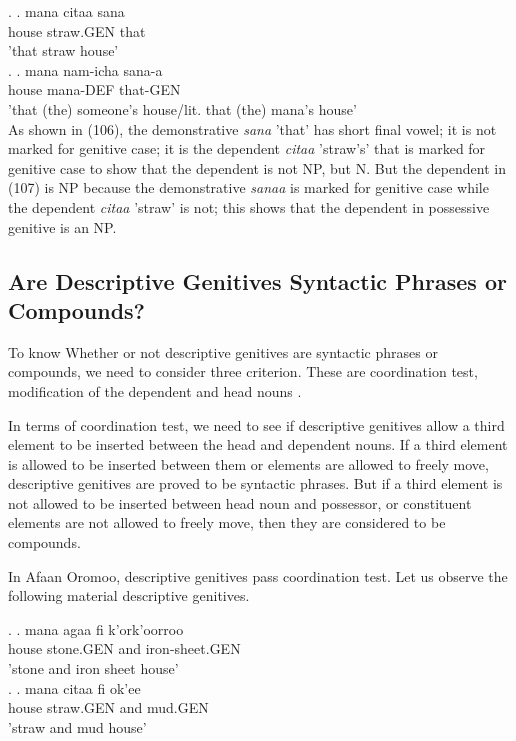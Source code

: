 \documentclass[11pt,a4paper]{article}
\begin{document}
	\ex.
	\ag.
	mana citaa sana \\
	house straw.GEN that\\
	'that  straw house'\\
	
	\ex.
	\ag.
	mana nam-icha sana-a\\
	house mana-DEF that-GEN\\
	'that (the) someone's house/lit. that (the) mana's house'\\
	
	As shown in (106), the demonstrative \emph{sana} 'that' has short final vowel; it is not marked for genitive case; it is the dependent \emph{citaa} 'straw's' that is marked for genitive case to show that the dependent is not NP, but N. But the dependent in (107) is NP because the demonstrative \emph{sanaa} is marked for genitive case while the dependent \emph{citaa} 'straw' is not; this shows that the dependent in possessive genitive is an NP. 
	
	\subsection{Are Descriptive Genitives Syntactic Phrases or Compounds?}
		
	To know Whether or not descriptive genitives are syntactic phrases or compounds, we need to consider three criterion. These are coordination test, modification of the dependent and head nouns \cite[83]{rosenbach2006descriptive}. 
	
	In terms of coordination test, we need to see if descriptive genitives allow a third element to be inserted between the head and dependent nouns. If a third element is allowed to be inserted between them or elements are allowed to freely move, descriptive genitives are proved to be syntactic phrases. But if a third element is not allowed to be inserted between head noun and possessor, or constituent elements are not allowed to freely move, then they are considered to be compounds. 
	
	In Afaan Oromoo, descriptive genitives pass coordination test. Let us observe the following material descriptive genitives. 
	
	
	\ex.
	\ag.
	mana agaa fi k'ork'oorroo\\
	house stone.GEN and iron-sheet.GEN\\
	'stone and iron sheet house'\\
	
	\ex.
	\ag.
	mana citaa fi ok'ee  \\
	house straw.GEN and mud.GEN\\
	'straw and mud house'\\
\end{document}
